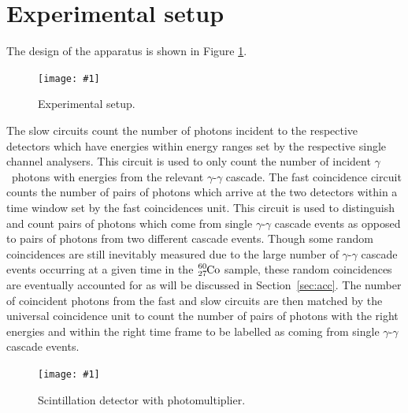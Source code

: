 \documentclass[twocolumn]{article}
\newcommand{\insertFigure}[1]{%
   \texttt{[image: \#1]}%
}
\begin{document}
\section{Experimental setup}
The design of the apparatus is shown in Figure \ref{fig:exp_setup}. 
\begin{figure}[!h]
	\centering
	\insertFigure{k223_setup.png}
	\caption{Experimental setup\cite{booklet}.}
	\label{fig:exp_setup}
\end{figure}
The slow circuits count the number of photons incident to the respective detectors which have energies within energy ranges set by the respective single channel analysers. This circuit is used to only count the number of incident $\gamma$~photons with energies from the relevant $\gamma$-$\gamma$ cascade. The fast coincidence circuit counts the number of pairs of photons which arrive at the two detectors within a time window set by the fast coincidences unit. This circuit is used to distinguish and count pairs of photons which come from single $\gamma$-$\gamma$ cascade events as opposed to pairs of photons from two different cascade events. Though some random coincidences are still inevitably measured due to the large number of $\gamma$-$\gamma$ cascade events occurring at a given time in the $\ce{_27^{60}Co}$ sample, these random coincidences are eventually accounted for as will be discussed in Section~\ref{sec:acc}. The number of coincident photons from the fast and slow circuits are then matched by the universal coincidence unit to count the number of pairs of photons with the right energies and within the right time frame to be labelled as coming from single $\gamma$-$\gamma$ cascade events.
\begin{figure}[!h]
	\centering
	\insertFigure{pmt.png}
	\caption{Scintillation detector with photomultiplier\cite{pmt}.} 
	\label{fig:pmt}
\end{figure}
\end{document}
